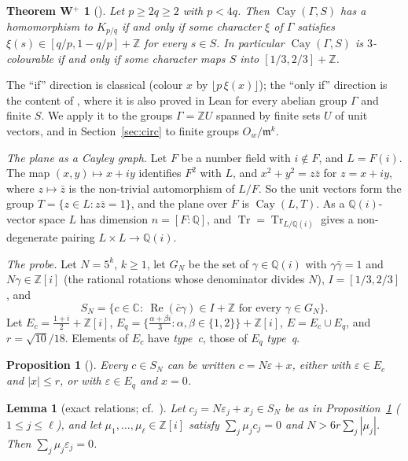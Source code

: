 \documentclass[11pt,a4paper]{amsart}
\newtheorem*{thmW}{Theorem W$^+$}
\newtheorem{lemma}{Lemma}
\newtheorem{proposition}{Proposition}
\theoremstyle{remark}
\newcommand{\Q}{\mathbb{Q}}
\newcommand{\Z}{\mathbb{Z}}
\newcommand{\C}{\mathbb{C}}
\newcommand{\Cay}{\operatorname{Cay}}
\newcommand{\Tr}{\operatorname{Tr}}
\begin{document}
\begin{thmW}[{\cite[Theorem~1]{Winding}}]
Let $p\ge2q\ge2$ with $p<4q$. Then $\Cay(\Gamma,S)$ has a homomorphism to $K_{p/q}$ if and only if some character
$\xi$ of $\Gamma$ satisfies $\xi(s)\in[q/p,1-q/p]+\Z$ for every $s\in S$. In particular $\Cay(\Gamma,S)$ is
$3$-colourable if and only if some character maps $S$ into $[1/3,2/3]+\Z$.
\end{thmW}

The ``if'' direction is classical (colour $x$ by $\lfloor p\,\xi(x)\rfloor$); the ``only if'' direction is the
content of \cite{Winding}, where it is also proved in Lean for every abelian group $\Gamma$ and finite $S$. We apply
it to the groups $\Gamma=\Z U$ spanned by finite sets $U$ of unit vectors, and in Section~\ref{sec:circ} to finite groups
$O_w/\mathfrak m^k$.

\emph{The plane as a Cayley graph.} Let $F$ be a number field with $i\notin F$, and $L=F(i)$. The map
$(x,y)\mapsto x+iy$ identifies $F^2$ with $L$, and $x^2+y^2=z\bar z$ for $z=x+iy$, where $z\mapsto\bar z$ is the
non-trivial automorphism of $L/F$. So the unit vectors form the group $T=\{z\in L:z\bar z=1\}$, and the plane over
$F$ is $\Cay(L,T)$. As a $\Q(i)$-vector space $L$ has dimension $n=[F:\Q]$, and $\Tr=\Tr_{L/\Q(i)}$ gives a
non-degenerate pairing $L\times L\to\Q(i)$.

\emph{The probe.} Let $N=5^k$, $k\ge1$, let $G_N$ be the set of $\gamma\in\Q(i)$ with $\gamma\bar\gamma=1$ and
$N\gamma\in\Z[i]$ (the rational rotations whose denominator divides $N$), $I=[1/3,2/3]$, and
\[
S_N=\{c\in\C:\ \operatorname{Re}(\bar c\gamma)\in I+\Z\text{ for every }\gamma\in G_N\}.
\]
Let $E_c=\frac{1+i}2+\Z[i]$, $E_q=\{\frac{\alpha+\beta i}3:\alpha,\beta\in\{1,2\}\}+\Z[i]$, $E=E_c\cup E_q$, and
$r=\sqrt{10}/18$. Elements of $E_c$ have \emph{type~c}, those of $E_q$ \emph{type~q}.

\begin{proposition}[{\cite[Proposition~9]{FC}}]\label{prop:shape}
Every $c\in S_N$ can be written $c=N\varepsilon+x$, either with $\varepsilon\in E_c$ and $|x|\le r$, or with
$\varepsilon\in E_q$ and $x=0$.
\end{proposition}

\begin{lemma}[exact relations; cf.\ {\cite[Lemma~10]{FC}}]\label{lem:exact}
Let $c_j=N\varepsilon_j+x_j\in S_N$ be as in Proposition~\ref{prop:shape} \textup{(}$1\le j\le\ell$\textup{)},
and let $\mu_1,\dots,\mu_\ell\in\Z[i]$ satisfy $\sum_j\mu_jc_j=0$ and $N>6r\sum_j|\mu_j|$. Then
$\sum_j\mu_j\varepsilon_j=0$.
\end{lemma}
\end{document}
